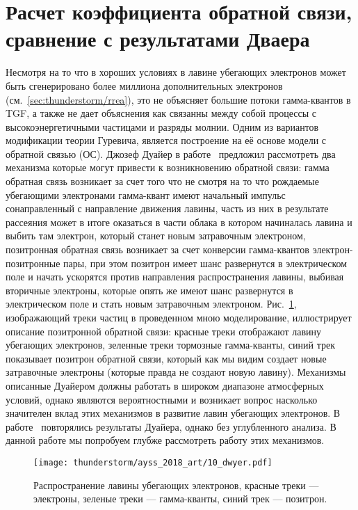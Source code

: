 \section{Расчет коэффициента обратной связи, сравнение с результатами Дваера}\label{sec:thunderstorm/rdfm}
Несмотря на то что в хороших условиях в лавине убегающих электронов может быть сгенерировано более миллиона дополнительных электронов (см.~\ref{sec:thunderstorm/rrea}), это не объясняет большие потоки гамма-квантов в TGF, а также не дает объяснения как связанны между собой процессы с высокоэнергетичными частицами и разряды молнии. Одним из вариантов модификации теории Гуревича, является построение на её основе модели с обратной связью (ОС). Джозеф Дуайер в работе~\cite{dwyer2003fundamental} предложил рассмотреть два механизма которые могут привести к возникновению обратной связи: гамма обратная связь возникает за счет того что не смотря на то что рождаемые убегающими электронами гамма-квант имеют начальный импульс сонаправленный с направление движения лавины, часть из них в результате рассеяния может в итоге оказаться в части облака в котором начиналась лавина и выбить там электрон, который станет новым затравочным электроном, позитронная обратная связь возникает за счет конверсии гамма-квантов электрон-позитронные пары, при этом позитрон имеет шанс развернутся в электрическом поле и начать ускорятся против направления распространения лавины, выбивая вторичные электроны, которые опять же имеют шанс развернутся в электрическом поле и стать новым затравочным электроном. Рис.~\ref{fig:storm:dwyer}, изображающий треки частиц в проведенном мною моделирование, иллюстрирует описание позитронной обратной связи: красные треки отображают лавину убегающих электронов, зеленные треки тормозные гамма-кванты, синий трек показывает позитрон обратной связи, который как мы видим создает новые затравочные электроны (которые правда не создают новую лавину). Механизмы описанные Дуайером должны работать в широком диапазоне атмосферных условий, однако являются вероятностными и возникает вопрос насколько значителен вклад этих механизмов в развитие лавин убегающих электронов. В работе~\cite{skeltved2014} повторялись результаты Дуайера, однако без углубленного анализа. В данной работе мы попробуем глубже рассмотреть работу этих механизмов.

\begin{figure}[ph!]
    \begin{center}
        \texttt{[image: thunderstorm/ayss\_2018\_art/10\_dwyer.pdf]}
        \caption{Распространение лавины убегающих электронов, красные треки --- электроны, зеленые треки --- гамма-кванты, синий трек --- позитрон.}
    \end{center}
    \label{fig:storm:dwyer}
\end{figure}

